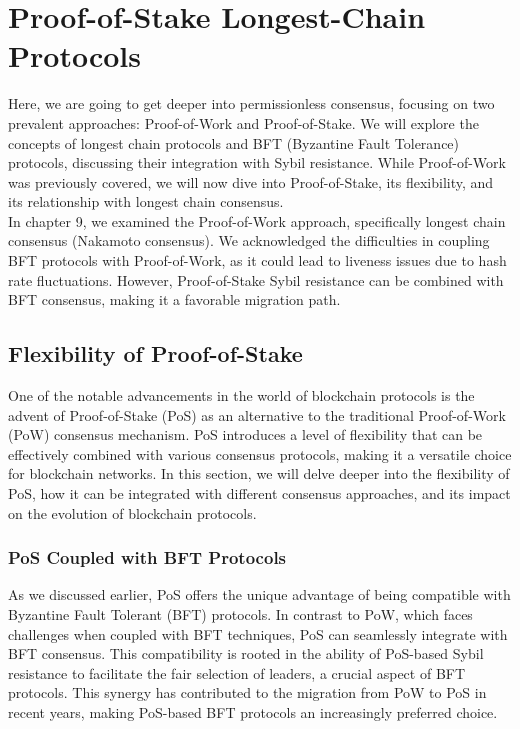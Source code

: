 \section{Proof-of-Stake Longest-Chain Protocols}
Here, we are going to get deeper into permissionless consensus, focusing on two prevalent approaches: Proof-of-Work and Proof-of-Stake. We will explore the concepts of longest chain protocols and BFT (Byzantine Fault Tolerance) protocols, discussing their integration with Sybil resistance. While Proof-of-Work was previously covered, we will now dive into Proof-of-Stake, its flexibility, and its relationship with longest chain consensus.\\
In chapter 9, we examined the Proof-of-Work approach, specifically longest chain consensus (Nakamoto consensus). We acknowledged the difficulties in coupling BFT protocols with Proof-of-Work, as it could lead to liveness issues due to hash rate fluctuations. However, Proof-of-Stake Sybil resistance can be combined with BFT consensus, making it a favorable migration path.

\subsection{Flexibility of Proof-of-Stake}
One of the notable advancements in the world of blockchain protocols is the advent of Proof-of-Stake (PoS) as an alternative to the traditional Proof-of-Work (PoW) consensus mechanism. PoS introduces a level of flexibility that can be effectively combined with various consensus protocols, making it a versatile choice for blockchain networks. In this section, we will delve deeper into the flexibility of PoS, how it can be integrated with different consensus approaches, and its impact on the evolution of blockchain protocols.

\subsubsection{PoS Coupled with BFT Protocols}
As we discussed earlier, PoS offers the unique advantage of being compatible with Byzantine Fault Tolerant (BFT) protocols. In contrast to PoW, which faces challenges when coupled with BFT techniques, PoS can seamlessly integrate with BFT consensus. This compatibility is rooted in the ability of PoS-based Sybil resistance to facilitate the fair selection of leaders, a crucial aspect of BFT protocols. This synergy has contributed to the migration from PoW to PoS in recent years, making PoS-based BFT protocols an increasingly preferred choice.

